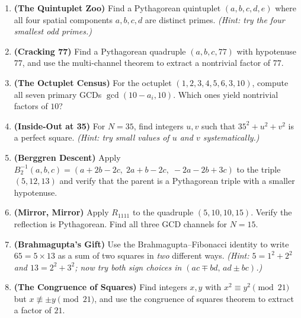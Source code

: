 \begin{enumerate}
\def\labelenumi{\arabic{enumi}.}
\item
  \textbf{(The Quintuplet Zoo)} Find a Pythagorean quintuplet \((a, b, c, d, e)\) where all four spatial components \(a, b, c, d\) are distinct primes. \emph{(Hint: try the four smallest odd primes.)}
\item
  \textbf{(Cracking 77)} Find a Pythagorean quadruple \((a, b, c, 77)\) with hypotenuse \(77\), and use the multi-channel theorem to extract a nontrivial factor of \(77\).
\item
  \textbf{(The Octuplet Census)} For the octuplet \((1, 2, 3, 4, 5, 6, 3, 10)\), compute all seven primary GCDs \(\gcd(10 - a_i, 10)\). Which ones yield nontrivial factors of \(10\)?
\item
  \textbf{(Inside-Out at 35)} For \(N = 35\), find integers \(u, v\) such that \(35^2 + u^2 + v^2\) is a perfect square. \emph{(Hint: try small values of \(u\) and \(v\) systematically.)}
\item
  \textbf{(Berggren Descent)} Apply \(B_2^{-1}(a, b, c) = (a + 2b - 2c,\; 2a + b - 2c,\; -2a - 2b + 3c)\) to the triple \((5, 12, 13)\) and verify that the parent is a Pythagorean triple with a smaller hypotenuse.
\item
  \textbf{(Mirror, Mirror)} Apply \(R_{1111}\) to the quadruple \((5, 10, 10, 15)\). Verify the reflection is Pythagorean. Find all three GCD channels for \(N = 15\).
\item
  \textbf{(Brahmagupta's Gift)} Use the Brahmagupta--Fibonacci identity to write \(65 = 5 \times 13\) as a sum of two squares in \emph{two} different ways. \emph{(Hint: \(5 = 1^2 + 2^2\) and \(13 = 2^2 + 3^2\); now try both sign choices in \((ac \mp bd, \, ad \pm bc)\).)}
\item
  \textbf{(The Congruence of Squares)} Find integers \(x, y\) with \(x^2 \equiv y^2 \pmod{21}\) but \(x \not\equiv \pm y \pmod{21}\), and use the congruence of squares theorem to extract a factor of \(21\).
\end{enumerate}
